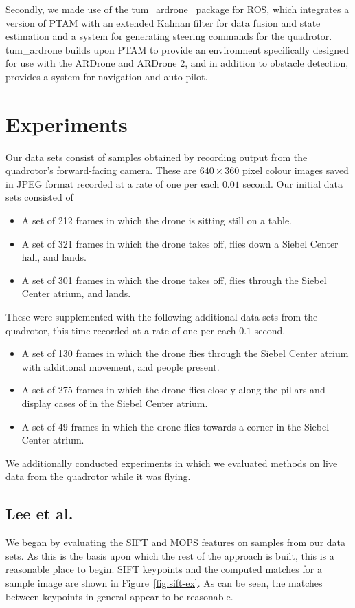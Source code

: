 \documentclass{acmsiggraph}
\begin{document}
Secondly, we made use of the tum\_ardrone~\cite{tumardrone} package for ROS, which integrates a version of PTAM with an extended Kalman filter for data fusion and state estimation and a system for generating steering commands for the quadrotor. tum\_ardrone builds upon PTAM to provide an environment specifically designed for use with the ARDrone and ARDrone 2, and in addition to obstacle detection, provides a system for navigation and auto-pilot.

\section{Experiments}
Our data sets consist of samples obtained by recording output from the quadrotor's forward-facing camera. These are $640 \times 360$ pixel colour images saved in JPEG format recorded at a rate of one per each $0.01$ second. Our initial data sets consisted of
\begin{itemize}
\item A set of 212 frames in which the drone is sitting still on a table.
\item A set of 321 frames in which the drone takes off, flies down a Siebel Center hall, and lands.
\item A set of 301 frames in which the drone takes off, flies through the Siebel Center atrium, and lands.
\end{itemize}
These were supplemented with the following additional data sets from the quadrotor, this time recorded at a rate of one per each $0.1$ second.
\begin{itemize}
\item A set of 130 frames in which the drone flies through the Siebel Center atrium with additional movement, and people present.
\item A set of 275 frames in which the drone flies closely along the pillars and display cases of in the Siebel Center atrium.
\item A set of 49 frames in which the drone flies towards a corner in the Siebel Center atrium.
\end{itemize}

We additionally conducted experiments in which we evaluated methods on live data from the quadrotor while it was flying.

\subsection{Lee et al.}
We began by evaluating the SIFT and MOPS features on samples from our data sets. As this is the basis upon which the rest of the approach is built, this is a reasonable place to begin. SIFT keypoints and the computed matches for a sample image are shown in Figure~\ref{fig:sift-ex}. As can be seen, the matches between keypoints in general appear to be reasonable.
\end{document}
